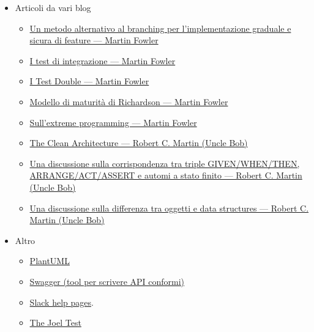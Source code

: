 \documentclass[../norme-di-progetto.tex]{subfiles}
\begin{document}
\begin{itemize}
\item Articoli da vari blog
\begin{itemize}
\item \href{https://martinfowler.com/articles/feature-toggles.html}{Un metodo alternativo al branching per l'implementazione graduale e sicura di feature --- Martin Fowler}
\item \href{https://martinfowler.com/bliki/IntegrationTest.html}{I test di integrazione --- Martin Fowler}
\item\href{https://martinfowler.com/articles/mocksArentStubs.html}{I Test Double --- Martin Fowler}
\item \href{https://martinfowler.com/articles/richardsonMaturityModel.html}{Modello di maturità di Richardson --- Martin Fowler}
\item \href{https://martinfowler.com/bliki/BeckDesignRules.html}{Sull'extreme programming --- Martin Fowler}
\item \href{https://blog.cleancoder.com/uncle-bob/2012/08/13/the-clean-architecture.html}{The Clean Architecture --- Robert C. Martin (Uncle Bob)}
\item \href{https://blog.cleancoder.com/uncle-bob/2018/06/06/PickledState.html}{Una discussione sulla corrispondenza tra triple GIVEN/WHEN/THEN, ARRANGE/ACT/ASSERT e automi a stato finito --- Robert C. Martin (Uncle Bob)}
\item \href{https://blog.cleancoder.com/uncle-bob/2019/06/16/ObjectsAndDataStructures.html}{Una discussione sulla differenza tra oggetti e data structures --- Robert C. Martin (Uncle Bob)}
\end{itemize}

\item Altro
\begin{itemize}
  \item \href{https://plantuml.com/}{PlantUML}
  \item \href{https://swagger.io/}{Swagger (tool per scrivere API conformi)}
  \item \href{https://slack.com/intl/en-it/help}{Slack help pages}.
  \item \href{https://www.joelonsoftware.com/2000/08/09/the-joel-test-12-steps-to-better-code/}{The Joel Test}
\end{itemize}
\end{itemize}

\end{document}
